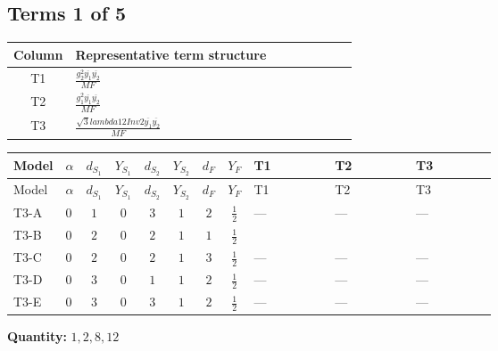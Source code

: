 \documentclass[8pt]{article}
\begin{document}
\begin{landscape}
\subsection*{Terms 1 of 5}
\begin{center}
\begin{tabular}{@{}c >{\raggedright\arraybackslash}p{0.82\linewidth}@{}}
\toprule
Column & Representative term structure \\
\midrule
T1 & \(\displaystyle \frac{g_{2}^{2} \overline{y_{1}} \overline{y_{2}}}{MF}\) \\
\midrule
T2 & \(\displaystyle \frac{g_{1}^{2} \overline{y_{1}} \overline{y_{2}}}{MF}\) \\
\midrule
T3 & \(\displaystyle \frac{\sqrt{3} lambda12Inv2 \overline{y_{1}} \overline{y_{2}}}{MF}\) \\
\midrule
\bottomrule
\end{tabular}
\end{center}
\smallskip
\tiny
\begin{longtable}{@{}llcccccc >{\raggedright\arraybackslash}p{0.21\linewidth} >{\raggedright\arraybackslash}p{0.21\linewidth} >{\raggedright\arraybackslash}p{0.21\linewidth}@{}}
\toprule
Model & $\alpha$ & $d_{S_1}$ & $Y_{S_1}$ & $d_{S_2}$ & $Y_{S_2}$ & $d_F$ & $Y_F$ & T1 & T2 & T3 \\
\midrule
\endfirsthead
\toprule
Model & $\alpha$ & $d_{S_1}$ & $Y_{S_1}$ & $d_{S_2}$ & $Y_{S_2}$ & $d_F$ & $Y_F$ & T1 & T2 & T3 \\
\midrule
\endhead
T3-A & $0$ & $1$ & $0$ & $3$ & $1$ & $2$ & $\frac{1}{2}$ & --- & --- & --- \\
\midrule
T3-B & $0$ & $2$ & $0$ & $2$ & $1$ & $1$ & $\frac{1}{2}$ & \scriptsize\adjustbox{max width=\linewidth}{$\begin{gathered} - \frac{3 g_{2}^{2} \overline{y_{1}} \overline{y_{2}}}{8 MF}\end{gathered}$} & \scriptsize\adjustbox{max width=\linewidth}{$\begin{gathered} - \frac{3 g_{1}^{2} \overline{y_{1}} \overline{y_{2}}}{16 MF}\end{gathered}$} & \scriptsize\adjustbox{max width=\linewidth}{$\begin{gathered} - \frac{\sqrt{3} lambda12Inv2 \overline{y_{1}} \overline{y_{2}}}{6 MF}\end{gathered}$} \\
\midrule
T3-C & $0$ & $2$ & $0$ & $2$ & $1$ & $3$ & $\frac{1}{2}$ & --- & --- & --- \\
\midrule
T3-D & $0$ & $3$ & $0$ & $1$ & $1$ & $2$ & $\frac{1}{2}$ & --- & --- & --- \\
\midrule
T3-E & $0$ & $3$ & $0$ & $3$ & $1$ & $2$ & $\frac{1}{2}$ & --- & --- & --- \\
\midrule
\bottomrule
\end{longtable}
\clearpage
\noindent\textbf{Quantity: }$\mathrm{1,2,8,12}$\par\smallskip

\end{landscape}
\end{document}
